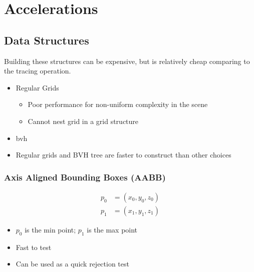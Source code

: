 \chapter{Accelerations}

\section{Data Structures}

  Building these structures can be expensive, but is relatively cheap
  comparing to the tracing operation.

  \begin{itemize}
    \item Regular Grids
    \begin{itemize}
      \item Poor performance for non-uniform complexity in the scene
      \item Cannot nest grid in a grid structure
    \end{itemize}

    \item \acrfull{bvh}
    \item Regular grids and BVH tree are faster to construct than other choices
  \end{itemize}

  \subsection{Axis Aligned Bounding Boxes (AABB)}

    \begin{align}
      p_{0} &= \left( x_{0}, y_{0}, z_{0} \right) \\
      p_{1} &= \left( x_{1}, y_{1}, z_{1} \right)
    \end{align}

    \begin{itemize}
      \item $ p_{0} $ is the min point; $ p_{1} $ is the max point
      \item Fast to test
      \item Can be used as a quick rejection test
    \end{itemize}
